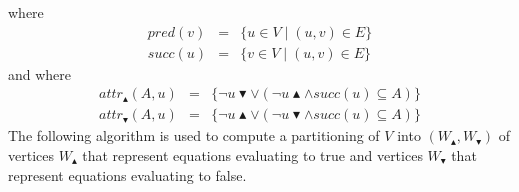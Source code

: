 where%
\begin{eqnarray*}
pred(v) &=&\{u\in V\mid (u,v)\in E\} \\
succ(u) &=&\{v\in V\mid (u,v)\in E\}
\end{eqnarray*}%
and where%
\begin{eqnarray*}
attr_{\blacktriangle }(A,u) &=&\{\lnot u\blacktriangledown \vee \left( \lnot
u\blacktriangle \wedge succ(u)\subseteq A\right) \} \\
attr_{\blacktriangledown }(A,u) &=&\{\lnot u\blacktriangle \vee \left( \lnot
u\blacktriangledown \wedge succ(u)\subseteq A\right) \}
\end{eqnarray*}%
The following algorithm is used to compute a partitioning of $V$ into $%
\left( W_{\blacktriangle },W_{\blacktriangledown }\right) $ of vertices $%
W_{\blacktriangle }$ that represent equations evaluating to true and
vertices $W_{\blacktriangledown }$ that represent equations evaluating to
false.%
